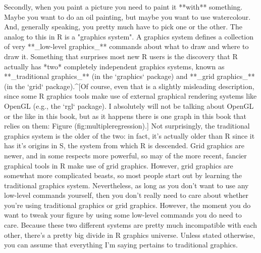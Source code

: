 Secondly, when you paint a picture you need to paint it **with** something. Maybe you want to do an oil painting, but maybe you want to use watercolour. And, generally speaking, you pretty much have to pick one or the other. The analog to this in R is a "graphics system". A graphics system defines a collection of very  **_low-level graphics_** commands about what to draw and where to draw it. Something that surprises most new R users is the discovery that R actually has *two* completely independent graphics systems, known as **_traditional graphics_** (in the `graphics` package) and **_grid graphics_** (in the `grid` package).^[Of course, even that is a slightly misleading description, since some R graphics tools make use of external graphical rendering systems like OpenGL (e.g., the `rgl` package). I absolutely will not be talking about OpenGL or the like in this book, but as it happens there is one graph in this book that relies on them: Figure \@ref(fig:multipleregression).] Not surprisingly, the traditional graphics system is the older of the two: in fact, it's actually older than R since it has it's origins in S, the system from which R is descended. Grid graphics are newer, and in some respects more powerful, so may of the more recent, fancier graphical tools in R make use of grid graphics. However, grid graphics are somewhat more complicated beasts, so most people start out by learning the traditional graphics system. Nevertheless, as long as you don't want to use any low-level commands yourself, then you don't really need to care about whether you're using traditional graphics or grid graphics. However, the moment you do want to tweak your figure by using some low-level commands you do need to care. Because these two different systems are pretty much incompatible with each other, there's a pretty big divide in R graphics universe. Unless stated otherwise, you can assume that everything I'm saying pertains to traditional graphics. 

